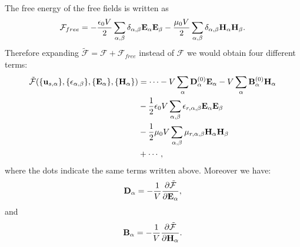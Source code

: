 \documentclass[12pt,a4paper,twoside]{report}
\begin{document}
The free energy of the free fields is written as
\begin{equation}
\mathcal{F}_{free}=-{\epsilon_0 V \over 2} \sum_{\alpha,\beta} 
\delta_{\alpha,\beta} {\bf E}_\alpha {\bf E}_\beta-
{\mu_0 V \over 2} \sum_{\alpha,\beta} 
\delta_{\alpha,\beta} {\bf H}_\alpha {\bf H}_\beta.
\end{equation}
Therefore expanding $\mathcal{\tilde F} = \mathcal{F} + \mathcal{F}_{free}$
instead of $\mathcal{F}$ we would obtain four different terms:
\begin{align}
\mathcal{\tilde F}(\{{\bf u}_{s,\alpha}\}, \{\epsilon_{\alpha,\beta}\},
\{ {\bf E}_\alpha\}, \{{\bf H}_\alpha\})&= \cdots -
V \sum_{\alpha} {\bf D}^{(0)}_\alpha {\bf E}_\alpha - 
V \sum_{\alpha} {\bf B}^{(0)}_\alpha {\bf H}_\alpha \nonumber \\
&- {1\over 2} \epsilon_0 V \sum_{\alpha,\beta} 
\epsilon_{r,\alpha,\beta}
{\bf E}_{\alpha}
{\bf E}_{\beta} \nonumber \\
&- {1\over 2} \mu_0 V \sum_{\alpha,\beta} 
\mu_{r,\alpha,\beta}
{\bf H}_{\alpha}
{\bf H}_{\beta} \nonumber \\
&+ \cdots,
\end{align}
where the dots indicate the same terms written above.
Moreover we have:
\begin{equation}
{\bf D}_\alpha = -{1\over V} {\partial \mathcal{\tilde F} \over 
\partial {\bf E}_\alpha},
\end{equation}
and
\begin{equation}
{\bf B}_\alpha = -{1\over V} {\partial \mathcal{\tilde F} \over 
\partial {\bf H}_\alpha}.
\end{equation}
\\
\end{document}
